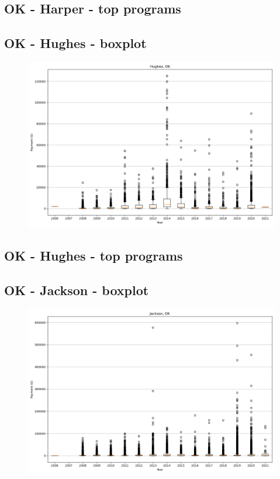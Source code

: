 \subsection*{OK - Harper - top programs}

\newpage
\subsection*{OK - Hughes - boxplot}
\begin{figure}[h]
\centering
\includegraphics[width=7in]{../output/boxplots/counties/Hughes-OK_boxplot.png}
\end{figure}


\subsection*{OK - Hughes - top programs}

\newpage
\subsection*{OK - Jackson - boxplot}
\begin{figure}[h]
\centering
\includegraphics[width=7in]{../output/boxplots/counties/Jackson-OK_boxplot.png}
\end{figure}


